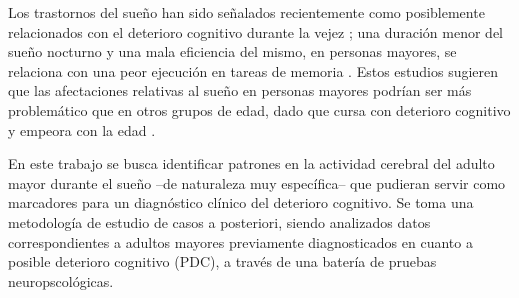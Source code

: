 Los trastornos del sue\~no han sido se\~nalados recientemente como posiblemente relacionados con el 
deterioro cognitivo durante la vejez \cite{Amer13,Miyata13,Potvin12}; una duraci\'on menor del 
sue\~no nocturno y una mala eficiencia del mismo, en personas mayores, se relaciona con una peor 
ejecuci\'on en tareas de memoria \cite{Reid06}. Estos estudios sugieren que las afectaciones
relativas al sue\~no en personas mayores podr\'ian ser m\'as problem\'atico que en otros grupos de 
edad, dado que cursa con deterioro cognitivo y empeora con la edad \cite{Potvin12}.

En este trabajo se busca identificar patrones en la actividad cerebral del adulto
mayor durante el sue\~no
--de naturaleza muy espec\'ifica-- 
que pudieran servir como marcadores para un diagn\'ostico cl\'inico del deterioro cognitivo.
Se toma una metodolog\'ia de estudio de casos a posteriori, siendo analizados datos 
correspondientes a adultos mayores previamente diagnosticados en cuanto a 
posible deterioro cognitivo (PDC), a trav\'es de una bater\'ia de pruebas neuropscol\'ogicas.

